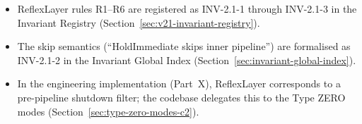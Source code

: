 \begin{itemize}
\item ReflexLayer rules R1--R6 are registered as
INV-2.1-1 through INV-2.1-3 in the Invariant Registry
(Section~\ref{sec:v21-invariant-registry}).
\item The skip semantics
(``HoldImmediate skips inner pipeline'') are formalised as
INV-2.1-2 in the Invariant Global Index
(Section~\ref{sec:invariant-global-index}).
\item In the engineering implementation (Part~X), ReflexLayer
corresponds to a pre-pipeline shutdown filter; the codebase
delegates this to the Type ZERO modes
(Section~\ref{sec:type-zero-modes-c2}).
\end{itemize}
